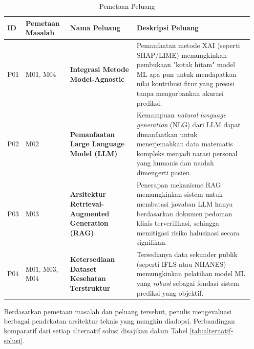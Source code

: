 \begin{table}[ht]
    \caption{Pemetaan Peluang}
    \label{tab:pemetaan-peluang}
    \centering
    \small
    \begin{tabular}{|p{1cm}|p{2.5cm}|p{3.5cm}|p{6cm}|}
        \hline
        \textbf{ID} & \textbf{Pemetaan Masalah} & \textbf{Nama Peluang} & \textbf{Deskripsi Peluang} \\
        \hline
        P01 & M01, M04 & \textbf{Integrasi Metode Model-Agnostic} & Pemanfaatan metode XAI (seperti SHAP/LIME) memungkinkan pembukaan "kotak hitam" model ML apa pun untuk mendapatkan nilai kontribusi fitur yang presisi tanpa mengorbankan akurasi prediksi. \\
        \hline
        P02 & M02 & \textbf{Pemanfaatan Large Language Model (LLM)} & Kemampuan \textit{natural language generation} (NLG) dari LLM dapat dimanfaatkan untuk menerjemahkan data matematis kompleks menjadi narasi personal yang humanis dan mudah dimengerti pasien. \\
        \hline
        P03 & M03 & \textbf{Arsitektur Retrieval-Augmented Generation (RAG)} & Penerapan mekanisme RAG memungkinkan sistem untuk membatasi jawaban LLM hanya berdasarkan dokumen pedoman klinis terverifikasi, sehingga memitigasi risiko halusinasi secara signifikan. \\
        \hline
        P04 & M01, M03, M04 & \textbf{Ketersediaan Dataset Kesehatan Terstruktur} & Tersedianya data sekunder publik (seperti IFLS atau NHANES) memungkinkan pelatihan model ML yang \textit{robust} sebagai fondasi sistem prediksi yang objektif. \\
        \hline
    \end{tabular}
\end{table}

Berdasarkan pemetaan masalah dan peluang tersebut, penulis mengevaluasi berbagai pendekatan arsitektur teknis yang mungkin diadopsi. Perbandingan komparatif dari setiap alternatif solusi disajikan dalam Tabel \ref{tab:alternatif-solusi}.


